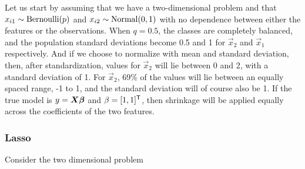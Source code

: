 Let us start by assuming that we have a two-dimensional problem and that \(x_{i1} \sim \operatorname{Bernoulli}(p)\) and \(x_{i2} \sim \operatorname{Normal}(0, 1)\) with no dependence between either the features or the observations. When \(q = 0.5\), the classes are completely balanced, and the population standard deviations become 0.5 and 1 for \(\vec{x}_2\) and \(\vec{x}_1\) respectively. And if we choose to normalize with mean and standard deviation, then, after standardization, values for \(\vec{x}_2\) will lie between 0 and 2, with a standard deviation of 1. For \(\vec{x}_2\), 69\% of the values will lie between an equally spaced range, -1 to 1, and the standard deviation will of course also be 1. If the true model is \(y = \boldsymbol{X}\boldsymbol{\beta}\) and \(\beta = [1,1]^{\mathsf{T}}\), then shrinkage will be applied equally across the coefficients of the two features.

\subsubsection{Lasso}
Consider the two dimensional problem

